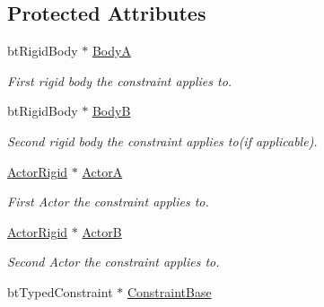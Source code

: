 \subsection*{Protected Attributes}
\begin{DoxyCompactItemize}
\item 
\hypertarget{classphys_1_1TypedConstraint_a5e4251df846e7afbab2e49039530a140}{
btRigidBody $\ast$ \hyperlink{classphys_1_1TypedConstraint_a5e4251df846e7afbab2e49039530a140}{BodyA}}
\label{d1/d17/classphys_1_1TypedConstraint_a5e4251df846e7afbab2e49039530a140}

\begin{DoxyCompactList}\small\item\em First rigid body the constraint applies to. \item\end{DoxyCompactList}\item 
\hypertarget{classphys_1_1TypedConstraint_ab90a86274d18f45628e91a76d28c8278}{
btRigidBody $\ast$ \hyperlink{classphys_1_1TypedConstraint_ab90a86274d18f45628e91a76d28c8278}{BodyB}}
\label{d1/d17/classphys_1_1TypedConstraint_ab90a86274d18f45628e91a76d28c8278}

\begin{DoxyCompactList}\small\item\em Second rigid body the constraint applies to(if applicable). \item\end{DoxyCompactList}\item 
\hypertarget{classphys_1_1TypedConstraint_a0fefb80c80d433bec9942b851b2f5a8a}{
\hyperlink{classphys_1_1ActorRigid}{ActorRigid} $\ast$ \hyperlink{classphys_1_1TypedConstraint_a0fefb80c80d433bec9942b851b2f5a8a}{ActorA}}
\label{d1/d17/classphys_1_1TypedConstraint_a0fefb80c80d433bec9942b851b2f5a8a}

\begin{DoxyCompactList}\small\item\em First Actor the constraint applies to. \item\end{DoxyCompactList}\item 
\hypertarget{classphys_1_1TypedConstraint_a04d2c49698d9a161e92112dd1efc1dcd}{
\hyperlink{classphys_1_1ActorRigid}{ActorRigid} $\ast$ \hyperlink{classphys_1_1TypedConstraint_a04d2c49698d9a161e92112dd1efc1dcd}{ActorB}}
\label{d1/d17/classphys_1_1TypedConstraint_a04d2c49698d9a161e92112dd1efc1dcd}

\begin{DoxyCompactList}\small\item\em Second Actor the constraint applies to. \item\end{DoxyCompactList}\item 
\hypertarget{classphys_1_1TypedConstraint_a31527f4782a0861fd6fd4bb7e201b23f}{
btTypedConstraint $\ast$ \hyperlink{classphys_1_1TypedConstraint_a31527f4782a0861fd6fd4bb7e201b23f}{ConstraintBase}}
\label{d1/d17/classphys_1_1TypedConstraint_a31527f4782a0861fd6fd4bb7e201b23f}


\end{DoxyCompactItemize}
